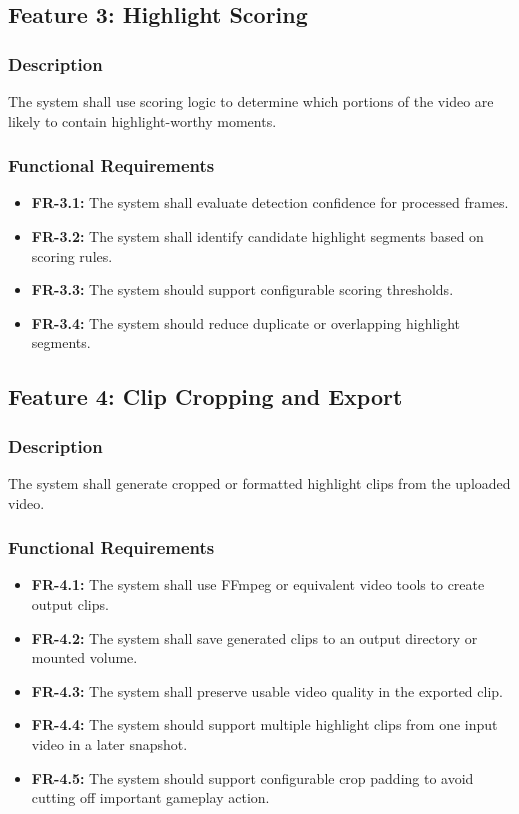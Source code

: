 \documentclass[12pt]{article}
\begin{document}
\subsection{Feature 3: Highlight Scoring}

\subsubsection{Description}
The system shall use scoring logic to determine which portions of the video are likely to contain highlight-worthy moments.

\subsubsection{Functional Requirements}
\begin{itemize}[noitemsep]
    \item \textbf{FR-3.1:} The system shall evaluate detection confidence for processed frames.
    \item \textbf{FR-3.2:} The system shall identify candidate highlight segments based on scoring rules.
    \item \textbf{FR-3.3:} The system should support configurable scoring thresholds.
    \item \textbf{FR-3.4:} The system should reduce duplicate or overlapping highlight segments.
\end{itemize}

\subsection{Feature 4: Clip Cropping and Export}

\subsubsection{Description}
The system shall generate cropped or formatted highlight clips from the uploaded video.

\subsubsection{Functional Requirements}
\begin{itemize}[noitemsep]
    \item \textbf{FR-4.1:} The system shall use FFmpeg or equivalent video tools to create output clips.
    \item \textbf{FR-4.2:} The system shall save generated clips to an output directory or mounted volume.
    \item \textbf{FR-4.3:} The system shall preserve usable video quality in the exported clip.
    \item \textbf{FR-4.4:} The system should support multiple highlight clips from one input video in a later snapshot.
    \item \textbf{FR-4.5:} The system should support configurable crop padding to avoid cutting off important gameplay action.
\end{itemize}
\end{document}
